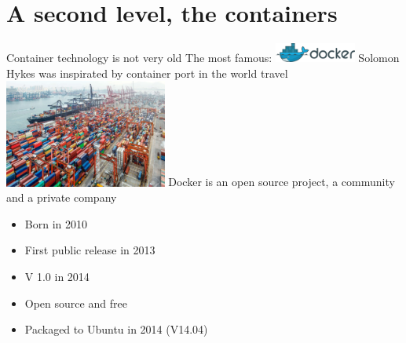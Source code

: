 \section{A second level, the containers}
\begin{frame}
Container technology is not very old \newline
\vspace{0.5cm}
The most famous: \includegraphics[width=0.2\textwidth]{images/docker_logo2.png} \newline
\vspace{0.5cm}
Solomon Hykes was inspirated by container port in the world travel \newline
\vspace{0.5cm}
\centering\includegraphics[width=0.4\textwidth]{images/container_port.pdf} \newline
Docker is an open source project, a community and a private company 
\end{frame}

\begin{frame}
\begin{itemize}
\item Born in 2010
\item First public release in 2013
\item V 1.0 in 2014
\item Open source and free
\item Packaged to Ubuntu in 2014 (V14.04)
\end{itemize}
\end{frame}

